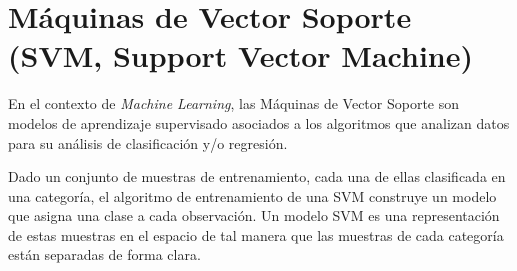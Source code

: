 \documentclass[12pt,spanish,a4paper]{article}
\numberwithin{equation}{section}
\begin{document}
%
% 

\newpage
\pagestyle{plain}
\setcounter{tocdepth}{5}
\tableofcontents


\newpage
\listoffigures


\newpage
\listoftables


\newpage
{}


\newpage
\pagestyle{fancy}

\renewcommand*{\headrulewidth}{0,4pt}
\renewcommand*{\footrulewidth}{0,4pt}

\fancyhead[HC]{}
\fancyfoot[FC]{}

\section{Máquinas de Vector Soporte (SVM, Support Vector
Machine)}\label{maquinas-de-vector-soporte-svm-support-vector-machine}

En el contexto de \emph{Machine Learning}, las Máquinas de Vector
Soporte son modelos de aprendizaje supervisado asociados a los
algoritmos que analizan datos para su análisis de clasificación y/o
regresión.

Dado un conjunto de muestras de entrenamiento, cada una de ellas
clasificada en una categoría, el algoritmo de entrenamiento de una SVM
construye un modelo que asigna una clase a cada observación. Un modelo
SVM es una representación de estas muestras en el espacio de tal manera
que las muestras de cada categoría están separadas de forma clara.
\end{document}

